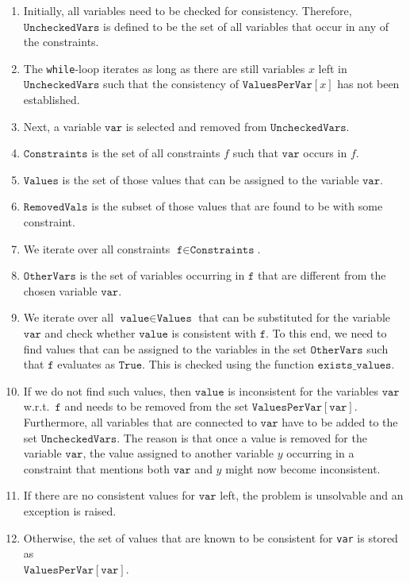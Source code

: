\begin{enumerate}
\item Initially, all variables need to be checked for consistency.  Therefore, $\texttt{UncheckedVars}$
      is defined to be the set of all variables that occur in any of the constraints.
\item The \texttt{while}-loop iterates as long as there are still variables $x$ left in $\texttt{UncheckedVars}$
      such that the consistency of $\texttt{ValuesPerVar}[x]$ has not been established.
\item Next, a variable $\texttt{var}$ is selected and removed from $\texttt{UncheckedVars}$. 
\item $\texttt{Constraints}$ is the set of all constraints $f$ such that $\texttt{var}$ occurs in $f$.
\item $\texttt{Values}$ is the set of those values that can be assigned to the variable $\texttt{var}$.
\item $\texttt{RemovedVals}$ is the subset of those values that are found to be  with some
      constraint. 
\item We iterate over all constraints $\texttt{f} \in \texttt{Constraints}$.
\item $\texttt{OtherVars}$ is the set of variables occurring in $\texttt{f}$ that are different from 
      the chosen variable $\texttt{var}$.
\item We iterate over all $\texttt{value} \in \texttt{Values}$ that can be substituted for the variable $\texttt{var}$
      and check whether $\texttt{value}$ is consistent with $\texttt{f}$.   To this end, we need to find values
      that can be assigned to the variables in the set $\texttt{OtherVars}$ such that $\texttt{f}$ evaluates as
      $\texttt{True}$.  This is checked using the function $\texttt{exists\_values}$.
\item If we do not find such values, then $\texttt{value}$ is inconsistent for the variables
      $\texttt{var}$ w.r.t.~$\texttt{f}$ and needs to be removed from the set 
      $\texttt{ValuesPerVar}[\texttt{var}]$.  Furthermore, all variables that are connected to
      $\texttt{var}$ have to be added to the set $\texttt{UncheckedVars}$.  The reason is that once a
      value is removed for the variable $\texttt{var}$, the value assigned to another variable $y$ occurring in a
      constraint that mentions both $\texttt{var}$ and $y$ might now become inconsistent.
\item If there are no consistent values for $\texttt{var}$ left, the problem is unsolvable and an exception is
      raised.
\item Otherwise, the set of values that are known to be consistent for \texttt{var} is stored
      as \\ $\texttt{ValuesPerVar}[\texttt{var}]$.
\end{enumerate}

